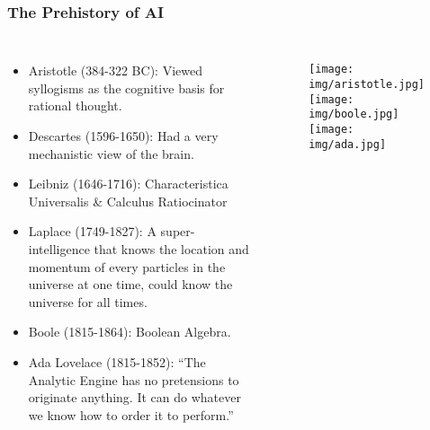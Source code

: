 \documentclass[UTF8,11pt,colorlinks,compress,openany]{beamer}%
\begin{document}
\begin{frame}\frametitle{The Prehistory of AI}
\vspace*{-4ex}
\begin{columns}
\begin{itemize}
	\item Aristotle (384-322 BC): Viewed syllogisms as the cognitive basis for rational thought.
	\item Descartes (1596-1650): Had a very mechanistic view of the brain.
	\item Leibniz (1646-1716): Characteristica Universalis \& Calculus Ratiocinator
	\item Laplace (1749-1827): A super-intelligence that knows the location and momentum of every particles in the universe at one time, could know the universe for all times.
	\item Boole (1815-1864): Boolean Algebra.
	\item Ada Lovelace (1815-1852): ``The Analytic Engine has no pretensions to originate anything. It can do whatever we know how to order it to perform.''
\end{itemize}
\begin{figure}[H]
\texttt{[image: img/aristotle.jpg]}
\texttt{[image: img/boole.jpg]}
\texttt{[image: img/ada.jpg]}
\end{figure}
\end{columns}
\end{frame}
\end{document}
